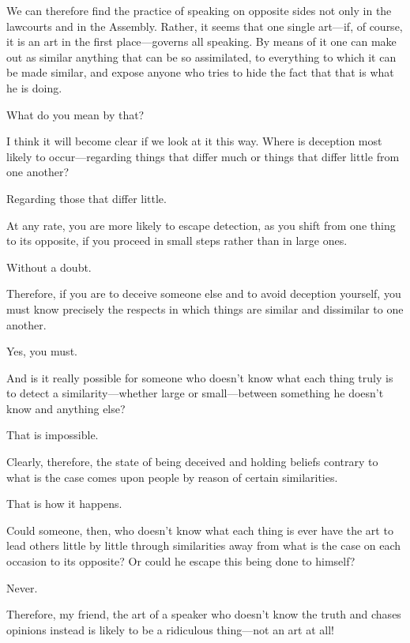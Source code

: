 \saysocrates We can therefore find the practice of speaking on opposite
sides not only in the lawcourts and in the Assembly. Rather, it
seems that one single art---if, of course, it is an art in the first
place---governs all speaking. By means of it one can make out as similar
anything that can be so assimilated, to everything to which it can be
made similar, and expose anyone who tries to hide the fact that that is
what he is doing.

\sayphaedrus What do you mean by that?

\saysocrates I think it will become clear if we look at it this way. Where
is deception most likely to occur---regarding things that differ much or
things that differ little from one another?

\sayphaedrus Regarding those that differ little.

\saysocrates At any rate, you are more likely to escape detection, as you
shift from one thing to its opposite, if you proceed in small steps
rather than in large ones.

\sayphaedrus Without a doubt.

\saysocrates Therefore, if you are to deceive someone else and to avoid
deception yourself, you must know precisely the respects in which things
are similar and dissimilar to one another.

\sayphaedrus Yes, you must.

\saysocrates And is it really possible for someone who doesn’t know what
each thing truly is to detect a similarity---whether large or
small---between something he doesn’t know and anything else?

\sayphaedrus That is impossible.

\saysocrates Clearly, therefore, the state of being deceived and holding
beliefs contrary to what is the case comes upon people by reason of
certain similarities.

\sayphaedrus That is how it happens.

\saysocrates Could someone, then, who doesn’t know what each thing is ever
have the art to lead others little by little through similarities away
from what is the case on each occasion to its opposite? Or could he
escape this being done to himself?

\sayphaedrus Never.

\saysocrates Therefore, my friend, the art of a speaker who doesn’t know 
the truth and chases opinions instead is likely to be a
ridiculous thing---not an art at all!

